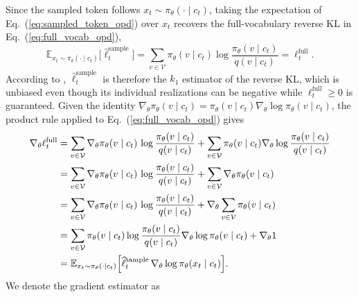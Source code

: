 \documentclass{article} %
\begin{document}
Since the sampled token follows $x_t\sim\pi_\theta(\cdot\mid c_t)$, taking the expectation of Eq.~(\ref{eq:sampled_token_opd}) over $x_t$ recovers the full-vocabulary reverse KL in Eq.~(\ref{eq:full_vocab_opd}),
\begin{equation}
    \mathbb{E}_{x_t\sim\pi_\theta(\cdot\mid c_t)}\bigl[\widehat{\ell}^{\mathrm{sample}}_t\bigr]
    =\sum_{v\in\mathcal{V}}\pi_\theta(v\mid c_t)\log\frac{\pi_\theta(v\mid c_t)}{q(v\mid c_t)}
    =\ell^{\mathrm{full}}_t .
    \label{eq:sampled_token_unbiased}
\end{equation}
According to \citet{schulman2020approximating}, $\widehat{\ell}^{\mathrm{sample}}_t$ is therefore the $k_1$ estimator of the reverse KL, which is unbiased even though its individual realizations can be negative while $\ell^{\mathrm{full}}_t\geq 0$ is guaranteed.
Given the identity $\nabla_\theta\pi_\theta(v\mid c_t)=\pi_\theta(v\mid c_t)\nabla_\theta\log\pi_\theta(v\mid c_t)$,
the product rule applied to Eq.~(\ref{eq:full_vocab_opd}) gives
\begin{equation}
\begin{aligned}
    \nabla_\theta\ell^{\mathrm{full}}_t
    &=\sum_{v\in\mathcal{V}}\nabla_\theta\pi_\theta(v\mid c_t)\,
      \log\frac{\pi_\theta(v\mid c_t)}{q(v\mid c_t)}
      +\sum_{v\in\mathcal{V}}\pi_\theta(v\mid c_t)\nabla_\theta\log\frac{\pi_\theta(v\mid c_t)}{q(v\mid c_t)}\\
    &=\sum_{v\in\mathcal{V}}\nabla_\theta\pi_\theta(v\mid c_t)\,
      \log\frac{\pi_\theta(v\mid c_t)}{q(v\mid c_t)}
      +\sum_{v\in\mathcal{V}}\nabla_\theta\pi_\theta(v\mid c_t)\\
    &=\sum_{v\in\mathcal{V}}\nabla_\theta\pi_\theta(v\mid c_t)\,
      \log\frac{\pi_\theta(v\mid c_t)}{q(v\mid c_t)}
      +\nabla_\theta\sum_{v\in\mathcal{V}}\pi_\theta(v\mid c_t)\\
    &=\sum_{v\in\mathcal{V}}\pi_\theta(v\mid c_t)\log\frac{\pi_\theta(v\mid c_t)}{q(v\mid c_t)}\nabla_\theta\log\pi_\theta(v\mid c_t)
      +\nabla_\theta 1\\
    &=\mathbb{E}_{x_t\sim\pi_\theta(\cdot\mid c_t)}\Bigl[\widehat{\ell}^{\mathrm{sample}}_t\,
      \nabla_\theta\log\pi_\theta(x_t\mid c_t)\Bigr].
\end{aligned}
\label{eq:full_vocab_grad}
\end{equation}
We denote the gradient estimator as
\end{document}
